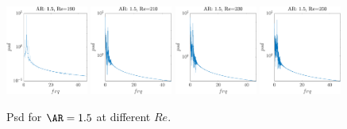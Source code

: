 \begin{figure}
  \centering
  \includegraphics[width=0.24\textwidth]{./fig/nnl/psdAR1.5RE190.png}
  \includegraphics[width=0.24\textwidth]{./fig/nnl/psdAR1.5RE210.png}
  \includegraphics[width=0.24\textwidth]{./fig/nnl/psdAR1.5RE230.png}
  \includegraphics[width=0.24\textwidth]{./fig/nnl/psdAR1.5RE250.png}
  \caption{Psd for $\AR=1.5$ at different $Re$.}
  \label{fig:ClCd}
\end{figure}
